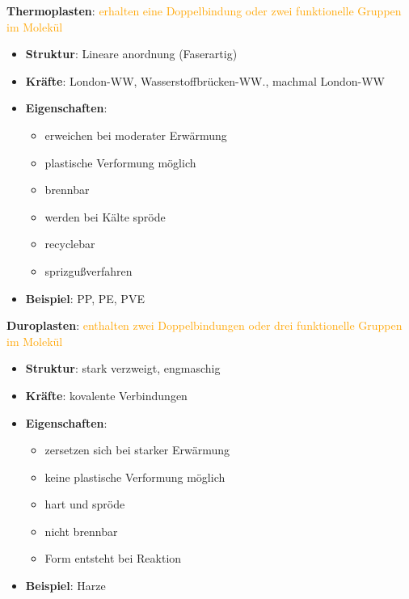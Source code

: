 \setlength{\columnseprule}{0.4pt}
\setlength{\columnsep}{1cm}
\begin{multicols}{2}

    \textbf{Thermoplasten}: \textcolor{orange}{erhalten eine Doppelbindung oder zwei funktionelle Gruppen im Molekül}
    \begin{itemize}
        \item \textbf{Struktur}: Lineare anordnung (Faserartig)
        \item \textbf{Kräfte}: London-WW, Wasserstoffbrücken-WW., machmal London-WW
        \item \textbf{Eigenschaften}:
            \begin{itemize}
                \item erweichen bei moderater Erwärmung
                \item plastische Verformung möglich
                \item brennbar
                \item werden bei Kälte spröde
                \item recyclebar
                \item sprizgußverfahren
            \end{itemize}
        \item \textbf{Beispiel}: PP, PE, PVE
    \end{itemize}

    \columnbreak

    \textbf{Duroplasten}: \textcolor{orange}{enthalten zwei Doppelbindungen oder drei funktionelle Gruppen im Molekül}
    \begin{itemize}
        \item \textbf{Struktur}: stark verzweigt, engmaschig
        \item \textbf{Kräfte}: kovalente Verbindungen
        \item \textbf{Eigenschaften}:
            \begin{itemize}
                \item zersetzen sich bei starker Erwärmung
                \item keine plastische Verformung möglich
                \item hart und spröde
                \item nicht brennbar
                \item Form entsteht bei Reaktion
            \end{itemize}
        \item \textbf{Beispiel}: Harze
    \end{itemize}

\end{multicols}

